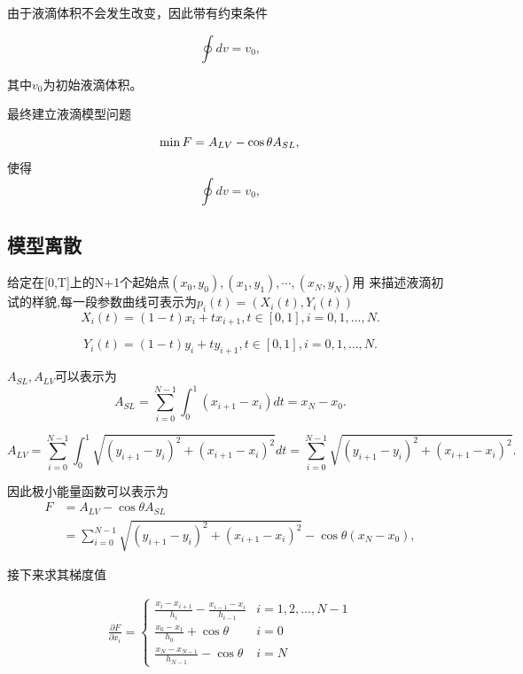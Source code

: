 \documentclass[12pt,oneside,a4paper]{article}
\begin{document}
由于液滴体积不会发生改变，因此带有约束条件

\begin{equation*}
\oint dv = v_0,
\end{equation*}

\noindent 其中$v_0$为初始液滴体积。

最终建立液滴模型问题

\begin{equation*}
\min  F = A_{LV}-\cos \theta A_{SL} ,\\
\end{equation*}
使得
\begin{equation*}
\oint dv = v_0,
\end{equation*}



\subsection{模型离散}
给定在[0,T]上的N+1个起始点$(x_{0},y_{0}),(x_{1},y_{1}),\cdots,(x_{N},y_{N})$用
来描述液滴初试的样貌,每一段参数曲线可表示为$p_{i}(t)=(X_{i}(t),Y_{i}(t))$
\begin{equation*}
X_{i}(t)=(1-t)x_{i}+tx_{i+1}, t \in [0,1],i=0,1,\dots,N.
\end{equation*}

\begin{equation*}
Y_{i}(t)=(1-t)y_{i}+ty_{i+1}, t \in [0,1],i=0,1,\dots,N.
\end{equation*}

\noindent $ A_{SL},A_{LV}$可以表示为
\begin{equation*}
A_{SL}=\sum_{i=0}^{N-1}\int_{0}^{1}(x_{i+1}-x_{i})dt=x_{N}-x_{0}.
\end{equation*}

\begin{equation*}
A_{LV}=\sum_{i=0}^{N-1}\int_{0}^{1}\sqrt{(y_{i+1}-y_{i} )^2+(x_{i+1}-x_{i})^2}dt=
\sum_{i=0}^{N-1}\sqrt{(y_{i+1}-y_{i} )^2+(x_{i+1}-x_{i})^2}.
\end{equation*}

\noindent 因此极小能量函数可以表示为
\begin{align*}
F &= A_{LV}-\cos\theta A_{SL} \\
  &=\sum_{i=0}^{N-1}\sqrt{(y_{i+1}-y_{i} )^2+(x_{i+1}-x_{i})^2} - \cos \theta (x_{N}-x_{0}),
\end{align*}

接下来求其梯度值

\begin{align*}
\frac{\partial F}{\partial x_i} = \left\{\begin{array}{ll}
\frac{x_{i}-x_{i+1}}{h_{i}} - \frac{x_{i-1}-x_{i}}{h_{i-1}} & i=1,2,\ldots,N-1 \\
\frac{x_0-x_1}{h_0} + \cos\theta & i=0 \\
\frac{x_N-x_{N-1}}{h_{N-1}} - \cos\theta & i=N
\end{array}\right.
\end{align*}
\end{document}
